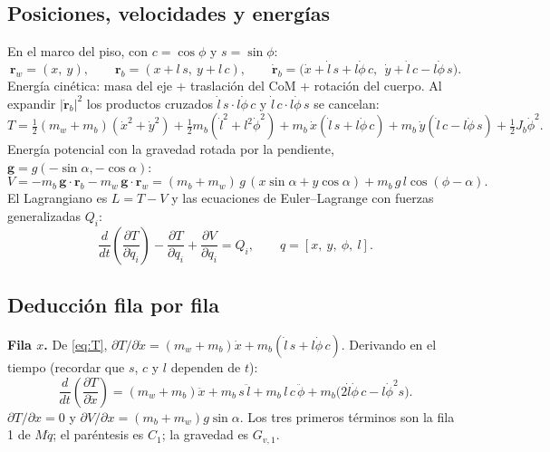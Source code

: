 \documentclass[11pt,a4paper]{article}
\newcommand{\dt}[1]{\frac{d}{dt}\!\left(#1\right)}
\begin{document}
\subsection{Posiciones, velocidades y energías}

En el marco del piso, con $c = \cos\phi$ y $s = \sin\phi$:
\begin{equation}
  \bm r_w = (x,\ y), \qquad \bm r_b = (x + l\,s,\ y + l\,c), \qquad
  \dot{\bm r}_b = \big(\dot x + \dot l\,s + l\dot\phi\,c,\ \ \dot y + \dot l\,c - l\dot\phi\,s\big).
\end{equation}
Energía cinética: masa del eje + traslación del CoM + rotación del cuerpo. Al expandir $|\dot{\bm r}_b|^2$
los productos cruzados $\dot l\,s\cdot l\dot\phi\,c$ y $\dot l\,c\cdot l\dot\phi\,s$ se cancelan:
\begin{equation}
  T = \tfrac12 (m_w + m_b)(\dot x^2 + \dot y^2) + \tfrac12 m_b(\dot l^2 + l^2\dot\phi^2)
      + m_b\,\dot x(\dot l\,s + l\dot\phi\,c) + m_b\,\dot y(\dot l\,c - l\dot\phi\,s) + \tfrac12 J_b\dot\phi^2 .
  \label{eq:T}
\end{equation}
Energía potencial con la gravedad rotada por la pendiente, $\bm g = g(-\sin\alpha, -\cos\alpha)$:
\begin{equation}
  V = -m_b\,\bm g\cdot\bm r_b - m_w\,\bm g\cdot\bm r_w
    = (m_b + m_w)\,g\,(x\sin\alpha + y\cos\alpha) + m_b\,g\,l\cos(\phi - \alpha).
  \label{eq:V}
\end{equation}
El Lagrangiano es $L = T - V$ y las ecuaciones de Euler--Lagrange con fuerzas generalizadas $Q_i$:
\begin{equation}
  \dt{\frac{\partial T}{\partial\dot q_i}} - \frac{\partial T}{\partial q_i} + \frac{\partial V}{\partial q_i} = Q_i,
  \qquad q = [x,\ y,\ \phi,\ l].
  \label{eq:EL}
\end{equation}

\subsection{Deducción fila por fila}

\textbf{Fila $x$.} De \eqref{eq:T}, $\partial T/\partial\dot x = (m_w+m_b)\dot x + m_b(\dot l\,s + l\dot\phi\,c)$.
Derivando en el tiempo (recordar que $s$, $c$ y $l$ dependen de $t$):
\begin{equation}
  \dt{\frac{\partial T}{\partial\dot x}} = (m_w+m_b)\ddot x + m_b\,s\,\ddot l + m_b\,l\,c\,\ddot\phi
  + m_b\big(2\dot l\dot\phi\,c - l\dot\phi^2 s\big).
\end{equation}
$\partial T/\partial x = 0$ y $\partial V/\partial x = (m_b+m_w)g\sin\alpha$. Los tres primeros términos son la
fila 1 de $M\ddot q$; el paréntesis es $C_1$; la gravedad es $G_{v,1}$.
\end{document}
